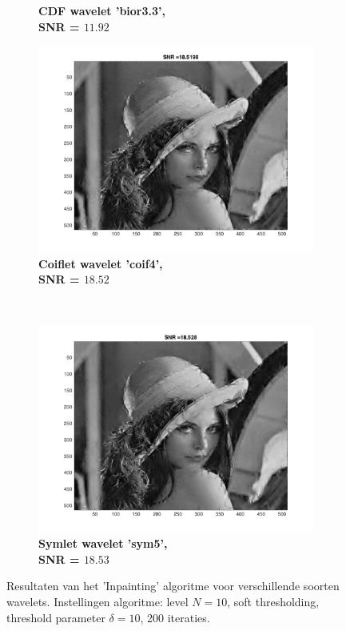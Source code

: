 \begin{figure}
\begin{subfigure}[b]{0.45\textwidth}
        \caption{\textbf{ CDF wavelet 'bior3.3', \\ SNR = $\mathbf{11.92}$} }
        \label{fig:matti_fig_bior33}
    \end{subfigure}
        \begin{subfigure}[b]{0.45\textwidth}
        \includegraphics[width=\textwidth]{../src/inpainting/vrag_2_4_coif4}
        \caption{\textbf{ Coiflet wavelet 'coif4', \\ SNR = $\mathbf{18.52}$} }
        \label{fig:matti_fig_coif4}
    \end{subfigure}
    ~ %
    \begin{subfigure}[b]{0.45\textwidth}
        \includegraphics[width=\textwidth]{../src/inpainting/vraag_2_4_sym5}
        \caption{\textbf{ Symlet wavelet 'sym5', \\ SNR = $\mathbf{18.53}$} }
        \label{fig:matti_fig_sym5}
    \end{subfigure}
    \caption{Resultaten van het 'Inpainting' algoritme voor verschillende soorten wavelets. Instellingen algoritme: level $N = 10$, soft thresholding, threshold parameter $\delta = 10$, 200 iteraties.}\label{fig:matti_fig_5}
\end{figure}




